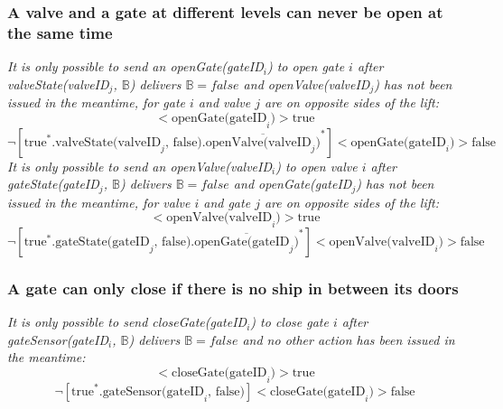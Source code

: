 \subsubsection{A valve and a gate at different levels can never be open at the same time}
\textit{It is only possible to send an openGate(gateID$_i$) to open gate $i$ after valveState(valveID$_j$, $ \mathbb{B} $) delivers $\mathbb{B} = false$ and openValve(valveID$_j$) has not been issued in the meantime, for gate $i$ and valve $j$ are on opposite sides of the lift:}\\
	\begin{equation*}
		[\textrm{true}^*.\textrm{valveState(valveID}_j\textrm{, false}).\overline{\textrm{openValve(valveID}_j)}^*]<\textrm{openGate(gateID}_i)>\textrm{true}
	\end{equation*}
	\begin{equation*}
		\neg[\textrm{true}^*.\textrm{valveState(valveID}_j\textrm{, false}).\overline{\textrm{openValve(valveID}_j)}^*]<\textrm{openGate(gateID}_i)>\textrm{false}
	\end{equation*}
\textit{It is only possible to send an openValve(valveID$_i$) to open valve $i$ after gateState(gateID$_j$, $ \mathbb{B} $) delivers $\mathbb{B} = false$ and openGate(gateID$_j$) has not been issued in the meantime, for valve $i$ and gate $j$ are on opposite sides of the lift:}\\
	\begin{equation*}
		[\textrm{true}^*.\textrm{gateState(gateID}_j\textrm{, false}).\overline{\textrm{openGate(gateID}_j)}^*]<\textrm{openValve(valveID}_i)>\textrm{true}
	\end{equation*}
	\begin{equation*}
		\neg[\textrm{true}^*.\textrm{gateState(gateID}_j\textrm{, false}).\overline{\textrm{openGate(gateID}_j)}^*]<\textrm{openValve(valveID}_i)>\textrm{false}
	\end{equation*}
	
\subsubsection{A gate can only close if there is no ship in between its doors}
\textit{It is only possible to send closeGate(gateID$_i$) to close gate $i$ after gateSensor(gateID$_i$, $\mathbb{B}$) delivers $\mathbb{B} = false$ and no other action has been issued in the meantime:}\\
	\begin{equation*}
		[\textrm{true}^*.\textrm{gateSensor(gateID}_i \textrm{, false})]<\textrm{closeGate(gateID}_i)>\textrm{true}
	\end{equation*}
	\begin{equation*}
		\neg[\textrm{true}^*.\textrm{gateSensor(gateID}_i \textrm{, false})]<\textrm{closeGate(gateID}_i)>\textrm{false}
	\end{equation*}
	

